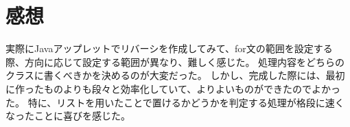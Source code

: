 \documentclass[10.5pt, a4paper]{jsarticle}
\begin{document}
\section{感想}
実際にJavaアップレットでリバーシを作成してみて、for文の範囲を設定する際、方向に応じて設定する範囲が異なり、難しく感じた。
処理内容をどちらのクラスに書くべきかを決めるのが大変だった。
しかし、完成した際には、最初に作ったものよりも段々と効率化していて、よりよいものができたのでよかった。
特に、リストを用いたことで置けるかどうかを判定する処理が格段に速くなったことに喜びを感じた。
\end{document}
